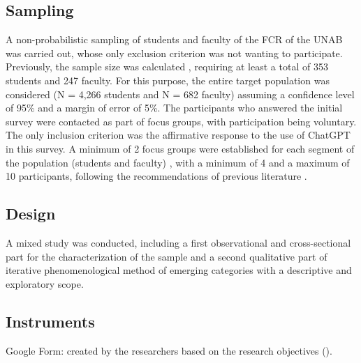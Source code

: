 \documentclass[english]{textolivre}
\begin{document}
\subsection{Sampling}
A non-probabilistic sampling of students and faculty of the FCR of the UNAB was carried out, whose only exclusion criterion was not wanting to participate. Previously, the sample size was calculated \cite[p. 178]{hernandez2014metodologia}, requiring at least a total of 353 students and 247 faculty. For this purpose, the entire target population was considered (N = 4,266 students and N = 682 faculty) assuming a confidence level of 95\% and a margin of error of 5\%. The participants who answered the initial survey were contacted as part of focus groups, with participation being voluntary. The only inclusion criterion was the affirmative response to the use of ChatGPT in this survey. A minimum of 2 focus groups were established for each segment of the population (students and faculty) \cite{prieto2002investigacion}, with a minimum of 4 and a maximum of 10 participants, following the recommendations of previous literature \cite{bonilla2017grupos,prieto2002investigacion}.

\subsection{Design}\label{sec-conduta}
A mixed study was conducted, including a first observational and cross-sectional part for the characterization of the sample and a second qualitative part of iterative phenomenological method of emerging categories \cite{creswell2016qualitative,rueda2023categorias} with a descriptive and exploratory scope.


\subsection{Instruments}\label{sec-fmt-manuscrito}
Google Form: created by the researchers based on the research objectives ().
\end{document}
